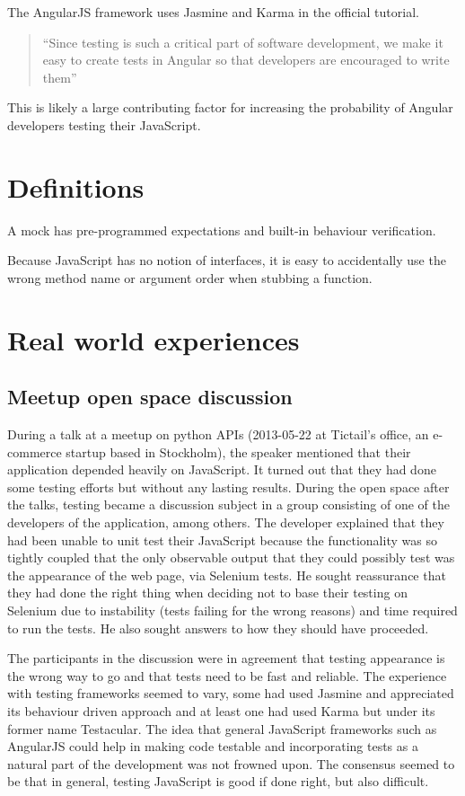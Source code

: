 \documentclass[11pt]{article}
\begin{document}
The AngularJS framework uses Jasmine and Karma in the official tutorial.

\begin{quote}
``Since testing is such a critical part of software development, we make it easy to create tests in Angular so that developers are encouraged to write them''\cite{AngularTemplates}
\end{quote}

This is likely a large contributing factor for increasing the probability of Angular developers testing their JavaScript.

\section{Definitions}

A mock has pre-programmed expectations and built-in behaviour verification\cite[p.~453]{Tddjs}.

Because JavaScript has no notion of interfaces, it is easy to accidentally use the wrong method name or argument order when stubbing a function\cite[p.~471]{Tddjs}.

\section{Real world experiences}

\subsection{Meetup open space discussion}

During a talk at a meetup on python APIs (2013-05-22 at Tictail's office, an e-commerce startup based in Stockholm), the speaker mentioned that their application depended heavily on JavaScript. It turned out that they had done some testing efforts but without any lasting results. During the open space after the talks, testing became a discussion subject in a group consisting of one of the developers of the application, among others. The developer explained that they had been unable to unit test their JavaScript because the functionality was so tightly coupled that the only observable output that they could possibly test was the appearance of the web page, via Selenium tests. He sought reassurance that they had done the right thing when deciding not to base their testing on Selenium due to instability (tests failing for the wrong reasons) and time required to run the tests. He also sought answers to how they should have proceeded.

The participants in the discussion were in agreement that testing appearance is the wrong way to go and that tests need to be fast and reliable. The experience with testing frameworks seemed to vary, some had used Jasmine and appreciated its behaviour driven approach and at least one had used Karma but under its former name Testacular. The idea that general JavaScript frameworks such as AngularJS could help in making code testable and incorporating tests as a natural part of the development was not frowned upon. The consensus seemed to be that in general, testing JavaScript is good if done right, but also difficult.

\printbibliography
\end{document}
